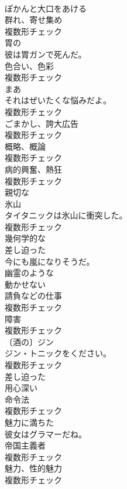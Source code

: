 \documentclass[8pt]{extreport}
\begin{document}
\begin{CJK}{UTF8}{min}
\\	[動詞]	ぽかんと大口をあける	
\\	[名詞]	群れ、寄せ集め	
\\	複数形チェック
\\	[形容詞]	胃の	
\\	彼は胃ガンで死んだ。	
\\	[名詞]	色合い、色彩	
\\	複数形チェック
\\	[名詞]	まあ	
\\	それはぜいたくな悩みだよ。	
\\	複数形チェック
\\	[名詞]	ごまかし、誇大広告	
\\	複数形チェック
\\	[名詞]	概略、概論	
\\	複数形チェック
\\	[名詞]	病的興奮、熱狂	
\\	複数形チェック
\\	[形容詞]	親切な	
\\	[名詞]	氷山	
\\	タイタニックは氷山に衝突した。	
\\	複数形チェック
\\	[形容詞]	幾何学的な	
\\	[形容詞]	差し迫った	
\\	今にも嵐になりそうだ。	
\\	[形容詞]	幽霊のような	
\\	[形容詞]	動かせない	
\\	[名詞]	請負などの仕事	
\\	複数形チェック
\\	[名詞]	障害	
\\	複数形チェック
\\	[名詞]	〔酒の〕ジン	
\\	ジン・トニックをください。	
\\	複数形チェック
\\	[形容詞]	差し迫った	
\\	[形容詞]	用心深い	
\\	[名詞]	命令法	
\\	複数形チェック
\\	[形容詞]	魅力に満ちた	
\\	彼女はグラマーだね。	
\\	[名詞]	帝国主義者	
\\	複数形チェック
\\	[名詞]	魅力、性的魅力	
\\	複数形チェック

\end{CJK}
\end{document}
